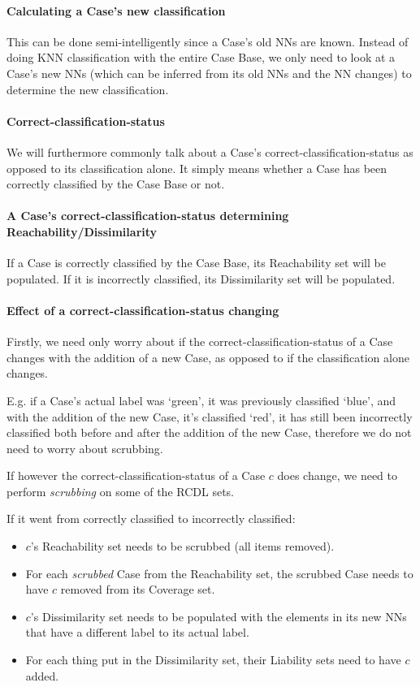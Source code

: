 \documentclass[a4paper,11pt]{report}
\begin{document}
\paragraph{Calculating a Case's new classification}
This can be done semi-intelligently since a Case's old NNs are known. Instead of doing KNN classification with the entire Case Base, we only need to look at a Case's new NNs (which can be inferred from its old NNs and the NN changes) to determine the new classification.

\paragraph{Correct-classification-status}
We will furthermore commonly talk about a Case's correct-classification-status as opposed to its classification alone. It simply means whether a Case has been correctly classified by the Case Base or not. 

\paragraph{A Case's correct-classification-status determining Reachability/Dissimilarity}
If a Case is correctly classified by the Case Base, its Reachability set will be populated. If it is incorrectly classified, its Dissimilarity set will be populated.
 
\paragraph{Effect of a correct-classification-status changing}
Firstly, we need only worry about if the correct-classification-status of a Case changes with the addition of a new Case, as opposed to if the classification alone changes.

E.g. if a Case's actual label was `green', it was previously classified `blue', and with the addition of the new Case, it's classified `red', it has still been incorrectly classified both before and after the addition of the new Case, therefore we do not need to worry about scrubbing.

If however the correct-classification-status of a Case $c$ does change, we need to perform \emph{scrubbing} on some of the RCDL sets.

If it went from correctly classified to incorrectly classified:
\begin{itemize}
	\item $c$'s Reachability set needs to be scrubbed (all items removed).
	\item For each \emph{scrubbed} Case from the Reachability set, the scrubbed Case needs to have $c$ removed from its Coverage set.
	\item $c$'s Dissimilarity set needs to be populated with the elements in its new NNs that have a different label to its actual label.
	\item For each thing put in the Dissimilarity set, their Liability sets need to have $c$ added.
\end{itemize}
\end{document}

